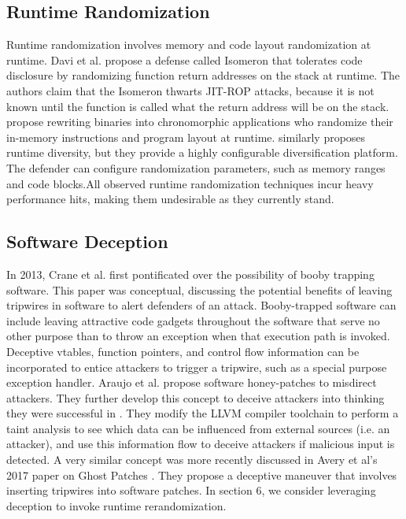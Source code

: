 \documentclass[preprint,12pt]{elsarticle}
\begin{document}
\subsection{Runtime Randomization}

Runtime randomization involves memory and code layout randomization at runtime. Davi et al. \cite{davi2015isomeron} propose a defense called Isomeron that tolerates code disclosure by randomizing function return addresses on the stack at runtime. The authors claim that the Isomeron thwarts JIT-ROP attacks, because it is not known until the function is called what the return address will be on the stack. \cite{friedman2015chronomorphic} propose rewriting binaries into chronomorphic applications who randomize their in-memory instructions and program layout at runtime. \cite{hawkins2017mixr} similarly proposes runtime diversity, but they provide a highly configurable diversification platform. The defender can configure randomization parameters, such as memory ranges and code blocks.All observed runtime randomization techniques incur heavy performance hits, making them undesirable as they currently stand.

\subsection{Software Deception}

In 2013, Crane et al. \cite{crane2013booby} first pontificated over the possibility of booby trapping software. This paper was conceptual, discussing the potential benefits of leaving tripwires in software to alert defenders of an attack. Booby-trapped software can include leaving attractive code gadgets throughout the software that serve no other purpose than to throw an exception when that execution path is invoked. Deceptive vtables, function pointers, and control flow information can be incorporated to entice attackers to trigger a tripwire, such as a special purpose exception handler. Araujo et al. \cite{araujo2014patches} propose software honey-patches to misdirect attackers. They further develop this concept to deceive attackers into thinking they were successful in \cite{araujo2015compiler}. They modify the LLVM compiler toolchain to perform a taint analysis to see which data can be influenced from external sources (i.e. an attacker), and use this information flow to deceive attackers if malicious input is detected. A very similar concept was more recently discussed in Avery et al's 2017 paper on Ghost Patches \cite{avery2017ghost}. They propose a deceptive maneuver that involves inserting tripwires into software patches. In section 6, we consider leveraging deception to invoke runtime rerandomization.
\end{document}
